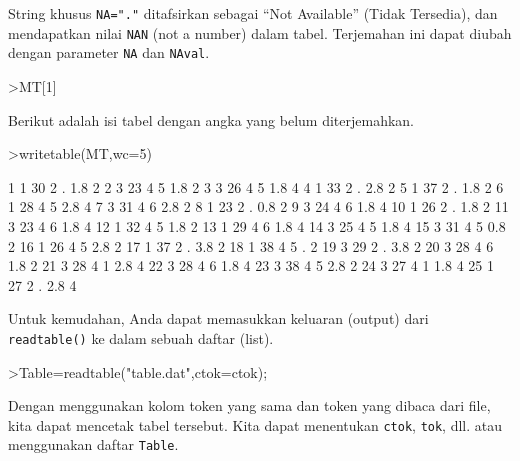 \documentclass[a4paper,11pt,oneside,enabledeprecatedfontcommands]{scrbook}
\newenvironment{eulernotebook}{}{}
\newenvironment{eulercomment}{\par\medskip\noindent}{\par\medskip}
\begin{document}
\begin{eulernotebook}
\begin{eulercomment}
			String khusus \texttt{NA="."} ditafsirkan sebagai ``Not Available'' (Tidak Tersedia), dan mendapatkan nilai \texttt{NAN}
			(not a number) dalam tabel. Terjemahan ini dapat diubah dengan parameter \texttt{NA} dan \texttt{NAval}.
		\end{eulercomment}
		\begin{eulerprompt}
			>MT[1]
		\end{eulerprompt}
		\begin{euleroutput}
			[1,  1,  30,  2,  NAN,  1.8,  2]
		\end{euleroutput}
		\begin{eulercomment}
			Berikut adalah isi tabel dengan angka yang belum diterjemahkan.
		\end{eulercomment}
		\begin{eulerprompt}
			>writetable(MT,wc=5)
		\end{eulerprompt}
		\begin{euleroutput}
			    1    1   30    2    .  1.8    2
			    2    3   23    4    5  1.8    2
			    3    3   26    4    5  1.8    4
			    4    1   33    2    .  2.8    2
			    5    1   37    2    .  1.8    2
			    6    1   28    4    5  2.8    4
			    7    3   31    4    6  2.8    2
			    8    1   23    2    .  0.8    2
			    9    3   24    4    6  1.8    4
			   10    1   26    2    .  1.8    2
			   11    3   23    4    6  1.8    4
			   12    1   32    4    5  1.8    2
			   13    1   29    4    6  1.8    4
			   14    3   25    4    5  1.8    4
			   15    3   31    4    5  0.8    2
			   16    1   26    4    5  2.8    2
			   17    1   37    2    .  3.8    2
			   18    1   38    4    5    .    2
			   19    3   29    2    .  3.8    2
			   20    3   28    4    6  1.8    2
			   21    3   28    4    1  2.8    4
			   22    3   28    4    6  1.8    4
			   23    3   38    4    5  2.8    2
			   24    3   27    4    1  1.8    4
			   25    1   27    2    .  2.8    4
		\end{euleroutput}
		\begin{eulercomment}
			Untuk kemudahan, Anda dapat memasukkan keluaran (output) dari \texttt{readtable()} ke dalam sebuah daftar
			(list).
		\end{eulercomment}
		\begin{eulerprompt}
			>Table={{readtable("table.dat",ctok=ctok)}};
		\end{eulerprompt}
		\begin{eulercomment}
			Dengan menggunakan kolom token yang sama dan token yang dibaca dari file, kita dapat mencetak tabel
			tersebut. Kita dapat menentukan \texttt{ctok}, \texttt{tok}, dll. atau menggunakan daftar \texttt{Table}.

\end{eulercomment}
\end{eulernotebook}
\end{document}
